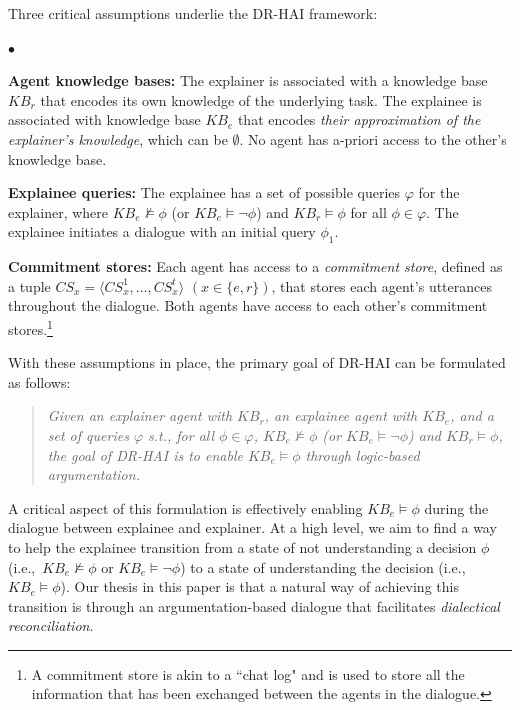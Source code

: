 \documentclass{ecai}
\newcommand{\squishlist}{
\begin{list}{$\bullet$}{ 
    \setlength{\itemsep}{1pt}
    \setlength{\parsep}{0pt}
    \setlength{\topsep}{1.5pt}
    \setlength{\partopsep}{0pt}
    \setlength{\leftmargin}{1em}
    \setlength{\labelwidth}{1em}
    \setlength{\labelsep}{0.5em} } }
\newcommand{\squishend}{\end{list}  }
\begin{document}
Three critical assumptions underlie the DR-HAI framework:


\squishlist
    \item \textbf{Agent knowledge bases:} The explainer is associated with a knowledge base $KB_r$ that encodes its own knowledge of the underlying task. The explainee is associated with knowledge base $KB_e$ that encodes \emph{their approximation of the explainer's knowledge}, which can be $\emptyset$. No agent has a-priori access to the other's knowledge base.
    
    
    \item \textbf{Explainee queries:} The explainee has a set of possible queries $\varphi$ for the explainer, %
    where $KB_e \not \models \phi$ (or $KB_e \models \neg \phi$) and $KB_r \models \phi$ for all $\phi \in \varphi$. The explainee initiates a dialogue with an initial query $\phi_1$.




    \item \textbf{Commitment stores:} Each agent has access to a \emph{commitment store}, defined as a tuple $CS_x = \langle CS_x^1, \ldots, CS_x^t \rangle$ $(x\in \{e, r\})$, that stores each agent's utterances throughout the dialogue. Both agents have access to each other's commitment stores.\footnote{A commitment store is akin to a ``chat log" and is used to store all the information that has been exchanged between the agents in the dialogue.}
    
\squishend

\noindent With these assumptions in place, the primary goal of DR-HAI can be formulated as follows:


\begin{quote}
    \emph{Given an explainer agent with $KB_r$, an explainee agent with $KB_e$, and a set of queries $\varphi$ s.t., for all $\phi \in \varphi$, $KB_e \not \models \phi$ (or $KB_e \models \neg \phi$) and $KB_r \models \phi$, the goal of DR-HAI is to \emph{enable} $KB_e \models \phi$ through logic-based argumentation.}
\end{quote}


A critical aspect of this formulation is effectively enabling $KB_e \models \phi$ during the dialogue between explainee and explainer. At a high level, we aim to find a way to help the explainee transition from a state of not understanding a decision $\phi$ (i.e.,~$KB_e \not \models \phi$ or $KB_e \models \neg \phi$) to a state of understanding the decision (i.e.,~$KB_e \models \phi$). Our thesis in this paper is that a natural way of achieving this transition is through an argumentation-based dialogue that facilitates \emph{dialectical reconciliation}.
\end{document}

